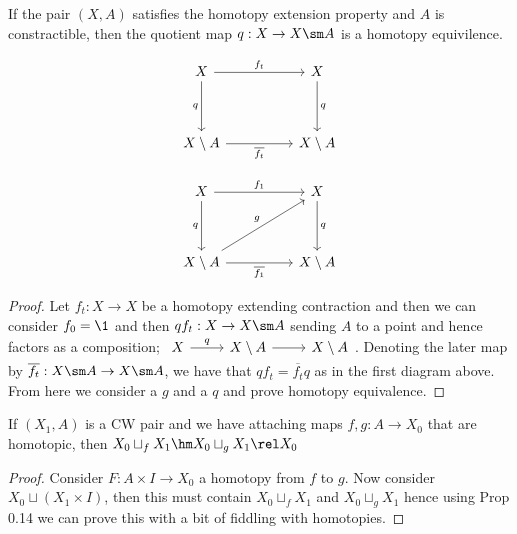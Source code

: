 \begin{nprop}
  If the pair $(X, A)$ satisfies the homotopy extension property and $A$ is constractible, then the quotient map $q : X \to X \sm A$ is a homotopy equivilence.
\end{nprop}

\begin{minipage}[t]{0.4\textwidth}
\centering
  \[\begin{tikzcd}[ampersand replacement=\&]
  	X \&\& X \\
  	\\
  	{X\setminus A} \&\& {X\setminus A}
  	\arrow["{f_t}", from=1-1, to=1-3]
  	\arrow["q"', from=1-1, to=3-1]
  	\arrow["q", from=1-3, to=3-3]
  	\arrow["{\overline{f_t}}"', from=3-1, to=3-3]
  \end{tikzcd}\]
\end{minipage}
\begin{minipage}[t]{0.4\textwidth}
\centering
  \[\begin{tikzcd}[ampersand replacement=\&]
  	X \&\& X \\
  	\\
  	{X\setminus A} \&\& {X\setminus A}
  	\arrow["{f_1}", from=1-1, to=1-3]
  	\arrow["q"', from=1-1, to=3-1]
  	\arrow["q", from=1-3, to=3-3]
  	\arrow["{\overline{f_1}}"', from=3-1, to=3-3]
  	\arrow["g", from=3-1, to=1-3]
  \end{tikzcd}\]
\end{minipage}

\begin{proof}
  Let $f_t : X \to X$ be a homotopy extending contraction and then we can consider $f_0 = \1$ and then $qf_t : X \to X\sm A$ sending $A$ to a point and hence factors as a composition; $\begin{tikzcd}
	X & {X\setminus A} & {X\setminus A}
	\arrow["q", from=1-1, to=1-2]
	\arrow[from=1-2, to=1-3]
\end{tikzcd}$. Denoting the later map by $\overline{f_t} : X \sm A \to X \sm A$, we have that $qf_t = \overline{f_t}q$ as in the first diagram above. From here we consider a $g$ and a $q$ and prove homotopy equivalence.
\end{proof}

\begin{nprop}
  If $(X_1, A)$ is a CW pair and we have attaching maps $f, g : A \to X_0$ that are homotopic, then $X_0 \sqcup_f X_1 \hm X_0 \sqcup_g X_1 \rel X_0$
\end{nprop}

\begin{proof}
  Consider $F : A \times I \to X_0$ a homotopy from $f$ to $g$. Now consider $X_0 \sqcup (X_1 \times I)$, then this must contain $X_0 \sqcup_f X_1$ and $X_0 \sqcup_g X_1$ hence using Prop 0.14 we can prove this with a bit of fiddling with homotopies.
\end{proof}

